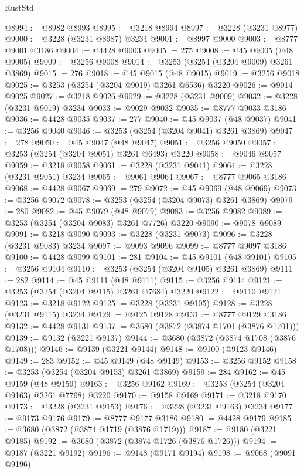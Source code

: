 \begin{lexlean}{RustStd}
\begin{coremodule}
@8994 := @8982 @8993
@8995 := @3218 @8994
@8997 := @3228 (@3231 @8977)
@9000 := @3228 (@3231 @8987) @3234
@9001 := @8997 @9000
@9003 := @8777 @9001 @3186
@9004 := @4428 @9003
@9005 := 275
@9008 := @45 @9005 (@48 @9005)
@9009 := @3256 @9008
@9014 := @3253 (@3254 (@3204 @9009) @3261 @3869)
@9015 := 276
@9018 := @45 @9015 (@48 @9015)
@9019 := @3256 @9018
@9025 := @3253 (@3254 (@3204 @9019) @3261 @6536) @3220
@9026 := @9014 @9025
@9027 := @3218 @9026
@9029 := @3228 (@3231 @9009)
@9032 := @3228 (@3231 @9019) @3234
@9033 := @9029 @9032
@9035 := @8777 @9033 @3186
@9036 := @4428 @9035
@9037 := 277
@9040 := @45 @9037 (@48 @9037)
@9041 := @3256 @9040
@9046 := @3253 (@3254 (@3204 @9041) @3261 @3869)
@9047 := 278
@9050 := @45 @9047 (@48 @9047)
@9051 := @3256 @9050
@9057 := @3253 (@3254 (@3204 @9051) @3261 @6493) @3220
@9058 := @9046 @9057
@9059 := @3218 @9058
@9061 := @3228 (@3231 @9041)
@9064 := @3228 (@3231 @9051) @3234
@9065 := @9061 @9064
@9067 := @8777 @9065 @3186
@9068 := @4428 @9067
@9069 := 279
@9072 := @45 @9069 (@48 @9069)
@9073 := @3256 @9072
@9078 := @3253 (@3254 (@3204 @9073) @3261 @3869)
@9079 := 280
@9082 := @45 @9079 (@48 @9079)
@9083 := @3256 @9082
@9089 := @3253 (@3254 (@3204 @9083) @3261 @7726) @3220
@9090 := @9078 @9089
@9091 := @3218 @9090
@9093 := @3228 (@3231 @9073)
@9096 := @3228 (@3231 @9083) @3234
@9097 := @9093 @9096
@9099 := @8777 @9097 @3186
@9100 := @4428 @9099
@9101 := 281
@9104 := @45 @9101 (@48 @9101)
@9105 := @3256 @9104
@9110 := @3253 (@3254 (@3204 @9105) @3261 @3869)
@9111 := 282
@9114 := @45 @9111 (@48 @9111)
@9115 := @3256 @9114
@9121 := @3253 (@3254 (@3204 @9115) @3261 @7684) @3220
@9122 := @9110 @9121
@9123 := @3218 @9122
@9125 := @3228 (@3231 @9105)
@9128 := @3228 (@3231 @9115) @3234
@9129 := @9125 @9128
@9131 := @8777 @9129 @3186
@9132 := @4428 @9131
@9137 := @3680 (@3872 (@3874 @1701 (@3876 @1701)))
@9139 := @9132 (@3221 @9137)
@9144 := @3680 (@3872 (@3874 @1708 (@3876 @1708)))
@9146 := @9139 (@3221 @9144)
@9148 := @9100 (@9123 @9146)
@9149 := 283
@9152 := @45 @9149 (@48 @9149)
@9153 := @3256 @9152
@9158 := @3253 (@3254 (@3204 @9153) @3261 @3869)
@9159 := 284
@9162 := @45 @9159 (@48 @9159)
@9163 := @3256 @9162
@9169 := @3253 (@3254 (@3204 @9163) @3261 @7768) @3220
@9170 := @9158 @9169
@9171 := @3218 @9170
@9173 := @3228 (@3231 @9153)
@9176 := @3228 (@3231 @9163) @3234
@9177 := @9173 @9176
@9179 := @8777 @9177 @3186
@9180 := @4428 @9179
@9185 := @3680 (@3872 (@3874 @1719 (@3876 @1719)))
@9187 := @9180 (@3221 @9185)
@9192 := @3680 (@3872 (@3874 @1726 (@3876 @1726)))
@9194 := @9187 (@3221 @9192)
@9196 := @9148 (@9171 @9194)
@9198 := @9068 (@9091 @9196)

\end{coremodule}
\end{lexlean}
